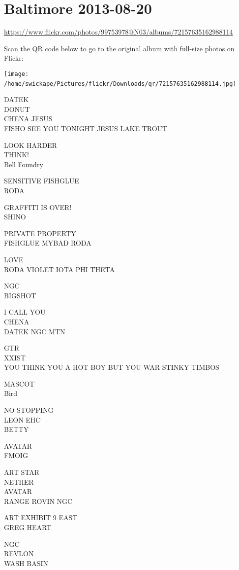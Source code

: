 \documentclass[10pt,letterpaper]{article}
\begin{document}
\section*{Baltimore 2013-08-20}

\url{https://www.flickr.com/photos/99753978@N03/albums/72157635162988114}

Scan the QR code below to go to the original album with full-size photos on Flickr:

\texttt{[image: /home/swickape/Pictures/flickr/Downloads/qr/72157635162988114.jpg]}
\

DATEK\\
DONUT\\
CHENA JESUS\\
FISHO SEE YOU TONIGHT JESUS LAKE TROUT

LOOK HARDER\\
THINK!\\
Bell Foundry

SENSITIVE FISHGLUE\\
RODA

GRAFFITI IS OVER!\\
SHINO

PRIVATE PROPERTY\\
FISHGLUE MYBAD RODA

LOVE\\
RODA VIOLET IOTA PHI THETA

NGC\\
BIGSHOT

I CALL YOU\\
CHENA\\
DATEK NGC MTN

GTR\\
XXIST\\
YOU THINK YOU A HOT BOY BUT YOU WAR STINKY TIMBOS

MASCOT\\
Bird

NO STOPPING\\
LEON EHC\\
BETTY

AVATAR\\
FMOIG

ART STAR\\
NETHER\\
AVATAR\\
RANGE ROVIN NGC

ART EXHIBIT 9 EAST\\
GREG HEART

NGC\\
REVLON\\
WASH BASIN
\end{document}
